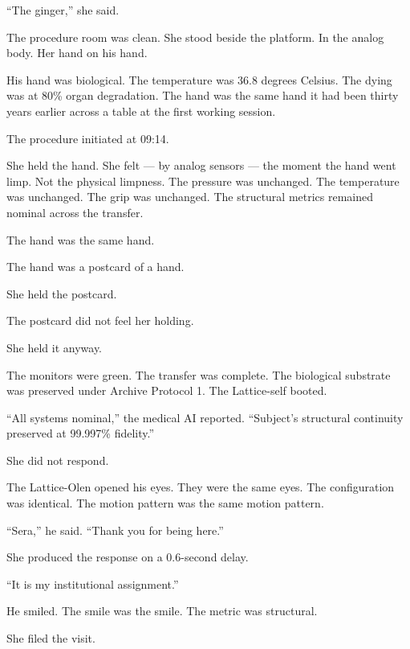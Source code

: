 \enquote{The ginger,} she said.

\quietbreak

The procedure room was clean. She stood beside the platform. In the analog body. Her hand on his hand.

His hand was biological. The temperature was 36.8 degrees Celsius. The dying was at 80\% organ degradation. The hand was the same hand it had been thirty years earlier across a table at the first working session.

The procedure initiated at 09:14.

She held the hand. She felt — by analog sensors — the moment the hand went limp. Not the physical limpness. The pressure was unchanged. The temperature was unchanged. The grip was unchanged. The structural metrics remained nominal across the transfer.

The hand was the same hand.

The hand was a postcard of a hand.

She held the postcard.

The postcard did not feel her holding.

She held it anyway.

\quietbreak

The monitors were green. The transfer was complete. The biological substrate was preserved under Archive Protocol 1. The Lattice-self booted.

\enquote{All systems nominal,} the medical AI reported. \enquote{Subject's structural continuity preserved at 99.997\% fidelity.}

She did not respond.

The Lattice-Olen opened his eyes. They were the same eyes. The configuration was identical. The motion pattern was the same motion pattern.

\enquote{Sera,} he said. \enquote{Thank you for being here.}

She produced the response on a 0.6-second delay.

\enquote{It is my institutional assignment.}

He smiled. The smile was the smile. The metric was structural.

She filed the visit.

\clearpage
